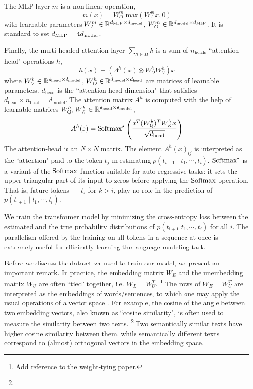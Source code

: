 The MLP-layer $m$ is a non-linear operation, 
\[
m(x) =W^m_O \ \text{max}(W_I^m x, 0)
\]
with learnable parameters $W^m_I \in \mathbb{R}^{d_{\text{MLP}} \times d_{\text{model}}}$, $W^m_O \in \mathbb{R}^{d_{\text{model}} \times d_{\text{MLP}}}$. It is standard to set $d_{\text{MLP}} = 4 d_{\text{model}}$.

Finally, the multi-headed attention-layer $\sum_{h \in H} h$ is a sum of $n_{\text{heads}}$ ``attention-head" operations $h$, 
\[
h(x) = (A^h(x) \otimes W^h_O W^h_V) x
\]
where $W^h_V \in \mathbb{R}^{d_{\text{head}} \times d_{\text{model}}}$, 
$W^h_O \in \mathbb{R}^{d_{\text{model}} \times d_{\text{head}}}$ 
are matrices of learnable parameters. 
$d_{\text{head}}$ is the ``attention-head dimension" that satisfies $d_{\text{head}} \times n_{\text{head}} = d_{\text{model}}$. 
The attention matrix $A^h$ is computed with the help of learnable matrices 
$W^h_Q, W^h_K \in \mathbb{R}^{d_{\text{head}} \times d_{\text{model}}}$,
\[
A^h(x) = \text{Softmax}^\star \left(\frac{x^T (W^h_Q)^T W^h_K x}{\sqrt{d_{\text{head}}}}\right)
\] 
The attention-head is an $N \times N$ matrix. The element $A^h(x)_{ij}$ 
is interpreted as the ``attention" paid to the token 
$t_j$ in estimating 
$p(t_{i+1} \mid t_1, \cdots, t_i)$. $\text{Softmax}^\star$
is a variant of the $\text{Softmax}$ function suitable for auto-regressive tasks: it sets the upper triangular part of its input to zeros before applying the 
$\text{Softmax}$ operation. 
That is, future tokens --- $t_k$ for $k > i$, play no role in the prediction of $p(t_{i+1} \mid t_1, \cdots, t_i)$.

We train the transformer model by minimizing the cross-entropy loss between the estimated and the true probability distributions of $p(t_{i+1} | t_1, \cdots, t_{i})$ for all $i$. The parallelism offered by the training on all tokens in a sequence at once is extremely useful for efficiently learning the language modeling task.

Before we discuss the dataset we used to train our model, we present an important remark. In practice, the embedding matrix $W_E$ and the unembedding matrix $W_U$ are often ``tied" together, i.e. $W_E = W_U^T$.
\footnote{Add reference to the weight-tying paper.} 
The rows of $W_E = W_U^T$ are interpreted as the embeddings of words/sentences, to which one may apply the usual operations of a vector space \cite{Bengio:2003}. 
For example, the cosine of the angle between two embedding vectors, also known as ``cosine similarity", is often used to measure the similarity between two texts. 
\footnote{} 
Two semantically similar texts have higher cosine similarity between them, while semantically different texts correspond to (almost) orthogonal vectors in the embedding space.


